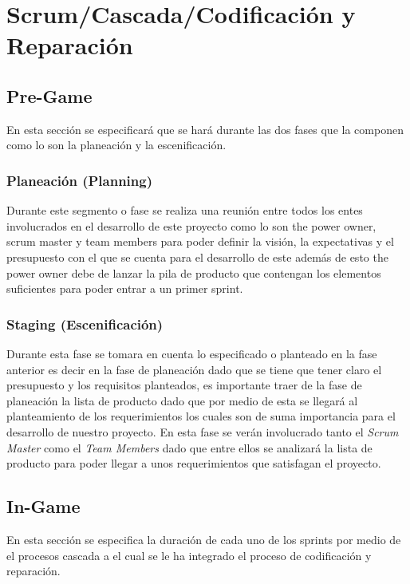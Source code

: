 \section{Scrum/Cascada/Codificación y Reparación}

\subsection{Pre-Game}
En esta sección se  especificará que se hará durante las dos fases que la componen como lo son la planeación y la escenificación.

\subsubsection{Planeación (Planning)}
Durante este segmento o fase se realiza una reunión entre todos los entes involucrados en el desarrollo de este proyecto como lo son the power owner, scrum master y team members  para poder definir la visión, la expectativas y el presupuesto con el que se cuenta para el desarrollo de este además de esto the power owner debe de lanzar la pila de producto que contengan los elementos suficientes para poder entrar a un primer sprint.

\subsubsection{Staging (Escenificación)}
Durante esta fase se tomara en cuenta lo especificado o planteado en la fase anterior es decir en la fase de planeación dado que se tiene que tener claro el presupuesto y los requisitos planteados, es importante traer de la fase de planeación la lista de producto dado que por medio de esta se llegará al planteamiento de los requerimientos los cuales son de suma importancia para el desarrollo de nuestro proyecto. En esta fase se verán involucrado tanto el \textit{Scrum Master} como el \textit{Team Members} dado que entre ellos se analizará la lista de producto para poder llegar a unos requerimientos que satisfagan el proyecto.

\subsection{In-Game}
En esta sección se  especifica la duración de cada uno de los sprints por medio de el procesos cascada a el cual se le ha integrado el proceso de codificación y reparación.

